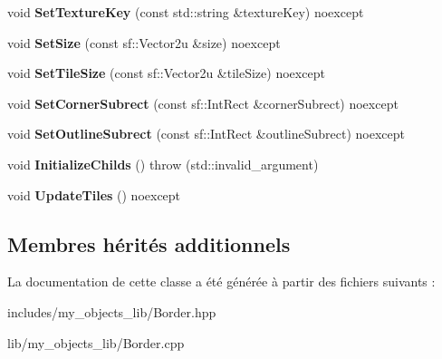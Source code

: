 \begin{DoxyCompactItemize}
void {\bfseries Set\+Texture\+Key} (const std\+::string \&texture\+Key) noexcept
\item 
\mbox{\label{classmy_1_1Border_adc7560e9269a9de9f7f2a88b154e520d}} 
void {\bfseries Set\+Size} (const sf\+::\+Vector2u \&size) noexcept
\item 
\mbox{\label{classmy_1_1Border_a9b095f0dafa161744f6f8a113d4bc021}} 
void {\bfseries Set\+Tile\+Size} (const sf\+::\+Vector2u \&tile\+Size) noexcept
\item 
\mbox{\label{classmy_1_1Border_a8bd8d973b026bc4568e01d5345b4f2b3}} 
void {\bfseries Set\+Corner\+Subrect} (const sf\+::\+Int\+Rect \&corner\+Subrect) noexcept
\item 
\mbox{\label{classmy_1_1Border_a34fffa6602d617e7e5907a8a52f60583}} 
void {\bfseries Set\+Outline\+Subrect} (const sf\+::\+Int\+Rect \&outline\+Subrect) noexcept
\item 
\mbox{\label{classmy_1_1Border_a18a8fac0b1abec5a98b74f9ec9d38464}} 
void {\bfseries Initialize\+Childs} ()  throw (std\+::invalid\+\_\+argument)
\item 
\mbox{\label{classmy_1_1Border_a02315dc4d26d3e31b68bb05c9759aa57}} 
void {\bfseries Update\+Tiles} () noexcept
\end{DoxyCompactItemize}
\subsection*{Membres hérités additionnels}


La documentation de cette classe a été générée à partir des fichiers suivants \+:\begin{DoxyCompactItemize}
\item 
includes/my\+\_\+objects\+\_\+lib/Border.\+hpp\item 
lib/my\+\_\+objects\+\_\+lib/Border.\+cpp\end{DoxyCompactItemize}
